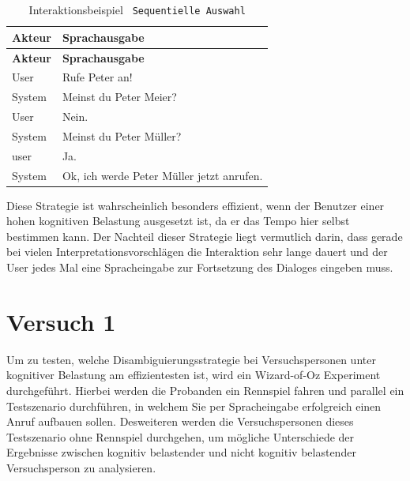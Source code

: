 \documentclass[12pt,a4paper]{scrartcl}
\begin{document}
\begin{longtable}{p{6cm}p{8cm}}
	\caption[Interaktionsbeispiel \texttt{Sequentielle Auswahl}]{Interaktionsbeispiel \texttt{ Sequentielle Auswahl}}\\
	\hline
	\textbf{Akteur} &	\textbf{Sprachausgabe}\\
	\hline
	\endfirsthead
	\hline
	\textbf{Akteur} &	\textbf{Sprachausgabe}\\
	\hline
	\endhead
User & Rufe Peter an!\\
System & Meinst du Peter Meier?\\
User & Nein.\\
System & Meinst du Peter Müller?\\
user & Ja.\\
System & Ok, ich werde Peter Müller jetzt anrufen.\\

\hline
\end{longtable}

Diese Strategie ist wahrscheinlich besonders effizient, wenn der Benutzer einer hohen kognitiven Belastung ausgesetzt ist, da er das Tempo hier selbst bestimmen kann. Der Nachteil dieser Strategie liegt vermutlich darin, dass gerade bei vielen Interpretationsvorschlägen die Interaktion sehr lange dauert und der User jedes Mal eine Spracheingabe zur Fortsetzung des Dialoges eingeben muss. 

\section{Versuch 1}
\label{versuch1}
Um zu testen, welche Disambiguierungsstrategie bei Versuchspersonen unter kognitiver Belastung am effizientesten ist, wird ein Wizard-of-Oz Experiment durchgeführt. Hierbei werden die Probanden ein Rennspiel fahren und parallel ein Testszenario durchführen, in welchem Sie per Spracheingabe erfolgreich einen Anruf aufbauen sollen. Desweiteren werden die Versuchspersonen dieses Testszenario ohne Rennspiel durchgehen, um mögliche Unterschiede der Ergebnisse zwischen kognitiv belastender und nicht kognitiv belastender Versuchsperson zu analysieren. 
\end{document}
